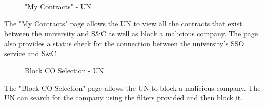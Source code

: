 \begin{figure}[H]
    \centering
    \caption{"My Contracts" - UN}
    \label{fig:my-contracts-un}
\end{figure}

\par The "My Contracts" page allows the UN to view all the contracts that exist between the university and S\&C as well
as block a malicious company. The page also provides a status check for the connection between the university's SSO
service and S\&C.

\begin{figure}[H]
    \centering
    \caption{Block CO Selection - UN}
    \label{fig:block-co-selection-un}
\end{figure}

\par The "Block CO Selection" page allows the UN to block a malicious company. The UN can search for the company using
the filters provided and then block it.

